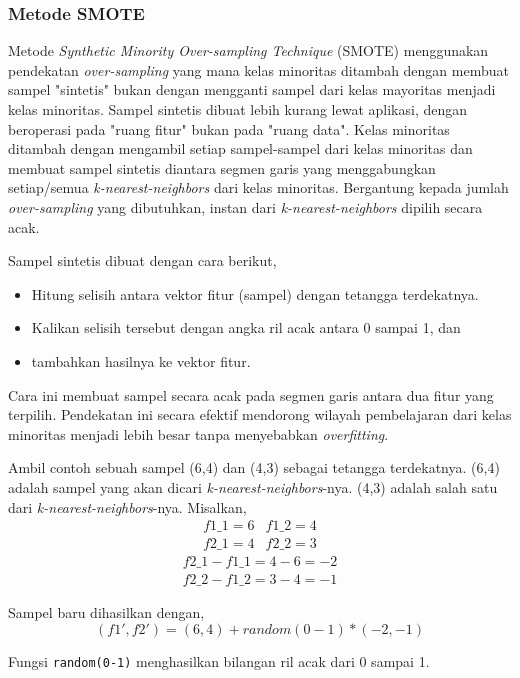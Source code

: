 \subsubsection{Metode SMOTE}

Metode \textit{Synthetic Minority Over-sampling Technique} (SMOTE) \cite{chawla2002smote} menggunakan pendekatan \textit{over-sampling} yang mana kelas minoritas ditambah dengan membuat sampel "sintetis" bukan dengan mengganti sampel dari kelas mayoritas menjadi kelas minoritas.
Sampel sintetis dibuat lebih kurang lewat aplikasi, dengan beroperasi pada "ruang fitur" bukan pada "ruang data".
Kelas minoritas ditambah dengan mengambil setiap sampel-sampel dari kelas minoritas dan membuat sampel sintetis diantara segmen garis yang menggabungkan setiap/semua \textit{k-nearest-neighbors} dari kelas minoritas.
Bergantung kepada jumlah \textit{over-sampling} yang dibutuhkan, instan dari \textit{k-nearest-neighbors} dipilih secara acak.

Sampel sintetis dibuat dengan cara berikut,
\begin{itemize}
	\item Hitung selisih antara vektor fitur (sampel) dengan tetangga terdekatnya.
	\item Kalikan selisih tersebut dengan angka ril acak antara 0 sampai 1, dan
	\item tambahkan hasilnya ke vektor fitur.
\end{itemize}

Cara ini membuat sampel secara acak pada segmen garis antara dua fitur yang terpilih.
Pendekatan ini secara efektif mendorong wilayah pembelajaran dari kelas minoritas menjadi lebih besar tanpa menyebabkan \textit{overfitting}.

Ambil contoh sebuah sampel (6,4) dan (4,3) sebagai tetangga terdekatnya.
(6,4) adalah sampel yang akan dicari \textit{k-nearest-neighbors}-nya.
(4,3) adalah salah satu dari \textit{k-nearest-neighbors}-nya.
Misalkan,
\[
\begin{matrix}
f1\_1 = 6 & f1\_2 = 4 \\
f2\_1 = 4 & f2\_2 = 3
\end{matrix}
\]
\[
\begin{matrix}
f2\_1 - f1\_1 = 4 - 6 = -2 \\
f2\_2 - f1\_2 = 3 - 4 = -1
\end{matrix}
\]

Sampel baru dihasilkan dengan,
\[
(f1', f2') = (6,4) + random(0-1) * (-2,-1)
\]

Fungsi \texttt{random(0-1)} menghasilkan bilangan ril acak dari 0 sampai 1.


